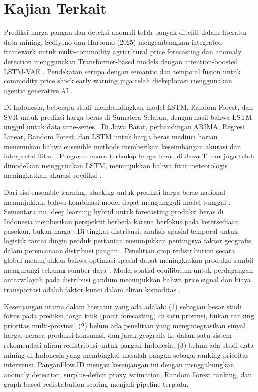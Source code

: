 \documentclass[journal, a4paper]{IEEEtran}
\begin{document}
\section{Kajian Terkait}
Prediksi harga pangan dan deteksi anomali telah banyak diteliti dalam literatur data mining.
Sediyono dan Hartomo (2025) mengembangkan integrated framework untuk multi-commodity
agricultural price forecasting dan anomaly detection menggunakan Transformer-based models
dengan attention-boosted LSTM-VAE \cite{1}. Pendekatan serupa dengan semantic dan temporal fusion
untuk commodity price shock early warning juga telah dieksplorasi menggunakan agentic
generative AI \cite{2}.

Di Indonesia, beberapa studi membandingkan model LSTM, Random Forest, dan SVR untuk
prediksi harga beras di Sumatera Selatan, dengan hasil bahwa LSTM unggul untuk data
time-series \cite{3}. Di Jawa Barat, perbandingan ARIMA, Regresi Linear, Random Forest, dan
LSTM untuk harga beras medium harian menemukan bahwa ensemble methods memberikan
keseimbangan akurasi dan interpretabilitas \cite{4}. Pengaruh cuaca terhadap harga beras di
Jawa Timur juga telah dimodelkan menggunakan LSTM, menunjukkan bahwa fitur meteorologis
meningkatkan akurasi prediksi \cite{5}.

Dari sisi ensemble learning, stacking untuk prediksi harga beras nasional menunjukkan
bahwa kombinasi model dapat mengungguli model tunggal \cite{6}. Sementara itu, deep learning
hybrid untuk forecasting produksi beras di Indonesia memberikan perspektif berbeda karena
berfokus pada ketersediaan pasokan, bukan harga \cite{7}. Di tingkat distribusi, analisis
spasial-temporal untuk logistik rantai dingin produk pertanian menunjukkan pentingnya
faktor geografis dalam perencanaan distribusi pangan \cite{8}. Penelitian crop redistribution
secara global menunjukkan bahwa optimasi spasial dapat meningkatkan produksi sambil
mengurangi tekanan sumber daya \cite{9}. Model spatial equilibrium untuk perdagangan
antarwilayah pada distribusi gandum menunjukkan bahwa price signal dan biaya transportasi
adalah faktor kunci dalam aliran komoditas \cite{10}.

Kesenjangan utama dalam literatur yang ada adalah: (1) sebagian besar studi fokus pada
prediksi harga titik (point forecasting) di satu provinsi, bukan ranking prioritas
multi-provinsi; (2) belum ada penelitian yang mengintegrasikan sinyal harga, neraca
produksi-konsumsi, dan jarak geografis ke dalam satu sistem rekomendasi aliran
redistribusi untuk pangan Indonesia; (3) belum ada studi data mining di Indonesia yang
membingkai masalah pangan sebagai ranking prioritas intervensi. PanganFlow.ID mengisi
kesenjangan ini dengan menggabungkan anomaly detection, surplus-deficit proxy estimation,
Random Forest ranking, dan graph-based redistribution scoring menjadi pipeline terpadu.
\end{document}

